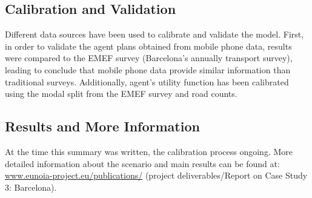 \subsection{Calibration and Validation}
Different data sources have been used to calibrate and validate the model. First, in order to validate the agent plans obtained from mobile phone data, results were compared to the EMEF survey (Barcelona’s annually transport survey), leading to conclude that mobile phone data provide similar information than traditional surveys. Additionally, agent’s utility function has been calibrated using the modal split from the EMEF survey and road counts.

\subsection{Results and More Information}
At the time this summary was written, the calibration process ongoing. More detailed information about the scenario and main results can be found at:
\url{www.eunoia-project.eu/publications/} (project deliverables/Report on Case Study 3: Barcelona).

